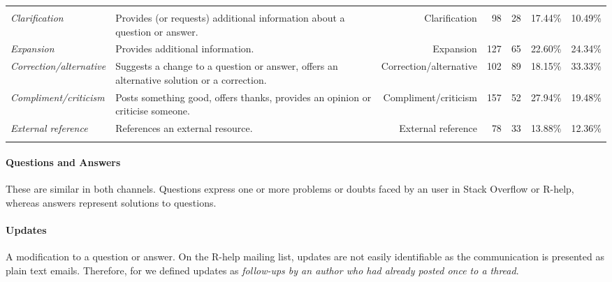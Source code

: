\begin{table}[!htb]
\begin{small}
\begin{tabular}[h]{p{2.3cm}p{10.3cm}rrrrr}

        \end{tabular}
      \end{small}
      \label{table:type-of-knowledge}
    \end{table}

\paragraph*{Questions and Answers}
    These are similar in both channels. Questions express one or more problems or doubts faced by an user in Stack Overflow or R-help, whereas answers represent solutions to questions.

\paragraph*{Updates}
	A modification to a question or answer.
	On the R-help mailing list, updates are not easily identifiable as the communication is presented as plain text emails.
	Therefore, for \RH we defined updates  as \emph{follow-ups by an author who had already posted once to a thread}.

